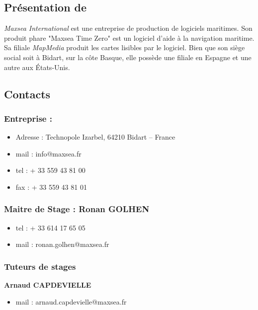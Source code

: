 
\subsection{Présentation de \maxsea}
\textit{Maxsea International} est une entreprise de production de
logiciels maritimes. Son produit phare "Maxsea Time Zero" est un
logiciel d'aide à la navigation maritime. Sa filiale \textit{MapMedia}
produit les cartes lisibles par le logiciel. Bien que son siège social
soit à Bidart, sur la côte Basque, elle possède une filiale en Espagne
et une autre aux États-Unis.


\subsection{Contacts}

\subsubsection*{Entreprise : \maxsea}
\begin{itemize}
\item Adresse : Technopole Izarbel, 64210 Bidart – France
\item mail : info@maxsea.fr
\item tel : + 33 559 43 81 00
\item fax : + 33 559 43 81 01
\end{itemize}

\subsubsection*{Maitre de Stage : Ronan GOLHEN}
\begin{itemize}
\item tel : + 33 614 17 65 05
\item mail : ronan.golhen@maxsea.fr
\end{itemize}


\subsubsection*{Tuteurs de stages}
\textbf{Arnaud CAPDEVIELLE}
\begin{itemize}
\item mail : arnaud.capdevielle@maxsea.fr 
\end{itemize}


